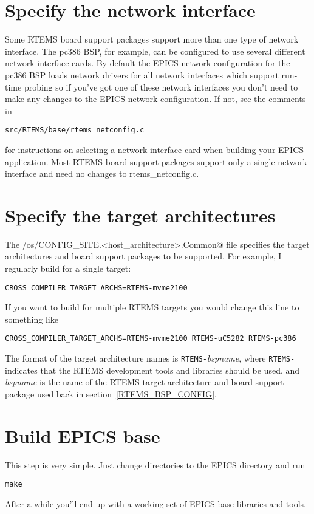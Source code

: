 \documentclass{report}
\begin{document}
\section{Specify the network interface}
Some RTEMS board support packages support more than one type of network interface.
The pc386 BSP, for example, can be configured to use several different
network interface cards.  By default the EPICS network configuration for
the pc386 BSP loads network drivers for all network interfaces which
support run-time probing so if you've got one of these network interfaces you
don't need to make any changes to the EPICS network configuration.
If not, see the comments in
\begin{alltt}
src/RTEMS/base/rtems_netconfig.c
\end{alltt}
for instructions on selecting a network interface card when building your
EPICS application.  
Most RTEMS board support packages support only a single network interface and
need no changes to rtems\_netconfig.c.

\section{Specify the target architectures}
The \verb@configure/os/CONFIG_SITE.<host_architecture>.Common@ file specifies the target
architectures and board support packages to be supported.
For example, I regularly build for a single target:
\begin{verbatim}
CROSS_COMPILER_TARGET_ARCHS=RTEMS-mvme2100
\end{verbatim}
If you want to build for multiple RTEMS targets you would change
this line to something like
\begin{verbatim}
CROSS_COMPILER_TARGET_ARCHS=RTEMS-mvme2100 RTEMS-uC5282 RTEMS-pc386
\end{verbatim}
The format of the target architecture names is {\tt RTEMS-}{\it bspname}, where
{\tt RTEMS-} indicates that the RTEMS development tools and libraries should
be used, and
{\it bspname} is the name of the RTEMS target architecture and
board support package used back in section~\ref{RTEMS_BSP_CONFIG}.


\section{Build EPICS base}
This step is very simple.  Just change directories to the EPICS \verb@base@ directory
and run
\begin{verbatim}
make
\end{verbatim}
After a while you'll end up with a working set of EPICS base libraries and tools.
\end{document}
